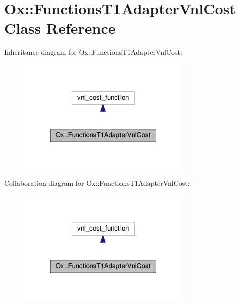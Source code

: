 \hypertarget{class_ox_1_1_functions_t1_adapter_vnl_cost}{\section{Ox\-:\-:Functions\-T1\-Adapter\-Vnl\-Cost Class Reference}
\label{class_ox_1_1_functions_t1_adapter_vnl_cost}
}


Inheritance diagram for Ox\-:\-:Functions\-T1\-Adapter\-Vnl\-Cost\-:
\nopagebreak
\begin{figure}[H]
\begin{center}
\leavevmode
\includegraphics[width=236pt]{class_ox_1_1_functions_t1_adapter_vnl_cost__inherit__graph}
\end{center}
\end{figure}


Collaboration diagram for Ox\-:\-:Functions\-T1\-Adapter\-Vnl\-Cost\-:
\nopagebreak
\begin{figure}[H]
\begin{center}
\leavevmode
\includegraphics[width=236pt]{class_ox_1_1_functions_t1_adapter_vnl_cost__coll__graph}
\end{center}
\end{figure}
